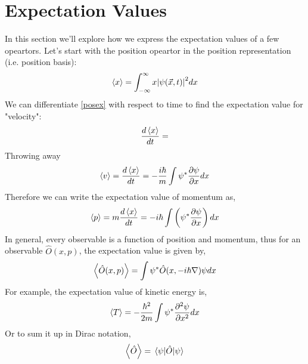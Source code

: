 \section{Expectation Values}
In this section we'll explore how we express the expectation values of a few opeartors. Let's start with the position opeartor in the position representation (i.e. position basis):
\begin{equation} \label{posex}
	\expval{x} = \int_{- \infty}^{\infty} x \abs{\psi(\vec{x}, t)}^{2} dx
\end{equation}
We can differentiate \ref{posex} with respect to time to find the expectation value for "velocity":
$$\frac{d \expval{x}}{dt} = $$
Throwing away 
\begin{equation}
	\expval{v} = \frac{d \expval{x}}{dt} = -\frac{i \hbar}{m} \int \psi^{*} \frac{\partial \psi}{\partial x} dx
\end{equation}
Therefore we can write the expectation value of momentum as,
\begin{equation}
	\expval{p} = m \frac{d \expval{x}}{dt} =  -i \hbar \int \left(\psi^{*} \frac{\partial \psi}{\partial x} \right) dx
\end{equation}
In general, every observable is a function of position and momentum, thus for an observable $\hat{O}(x,p)$, the expectation value is given by,
\begin{equation}
	\expval{\hat{O}(x,p)} = \int \psi^{*} \hat{O}(x,-i \hbar \nabla) \psi dx
\end{equation}
For example, the expectation value of kinetic energy is,
\begin{equation}
\expval{T} = -\frac{\hbar^{2}}{2m} \int \psi^{*} \frac{\partial^{2} \psi}{\partial x^{2}} dx
\end{equation}
Or to sum it up in Dirac notation,
\begin{equation}
	\expval{\hat{O}} = \expval{\hat{O}}{\psi}
\end{equation}
